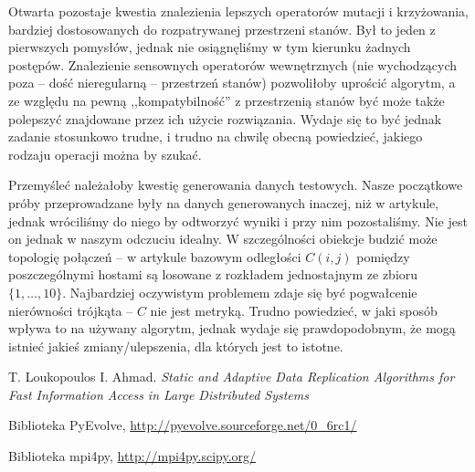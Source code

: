 \documentclass[11pt,pdftex,a4paper]{scrartcl}
\begin{document}
Otwarta pozostaje kwestia znalezienia lepszych operatorów mutacji i krzyżowania, bardziej dostosowanych
do rozpatrywanej przestrzeni stanów. Był to jeden z pierwszych pomysłów, jednak nie osiągnęliśmy w tym
kierunku żadnych postępów. Znalezienie sensownych operatorów wewnętrznych (nie wychodzących poza --
dość nieregularną -- przestrzeń stanów) pozwoliłoby uprościć algorytm, a ze względu na pewną 
,,kompatybilność'' z przestrzenią stanów być może także polepszyć znajdowane przez ich użycie 
rozwiązania. Wydaje się to być jednak zadanie stosunkowo trudne, i trudno na chwilę obecną powiedzieć,
jakiego rodzaju operacji można by szukać.

Przemyśleć należałoby kwestię generowania danych testowych. Nasze początkowe próby przeprowadzane
były na danych generowanych inaczej, niż w artykule, jednak wróciliśmy do niego by odtworzyć wyniki
i przy nim pozostaliśmy. Nie jest on jednak w naszym odczuciu idealny. W szczególności obiekcje 
budzić może topologię połączeń -- w artykule bazowym odległości \(C(i,j)\) pomiędzy poszczególnymi
hostami są losowane z rozkładem jednostajnym ze zbioru \(\{1,\ldots,10\}\). Najbardziej oczywistym
problemem zdaje się być pogwałcenie nierówności trójkąta -- \(C\) nie jest metryką. Trudno powiedzieć,
w jaki sposób wpływa to na używany algorytm, jednak wydaje się prawdopodobnym, że mogą istnieć jakieś
zmiany/ulepszenia, dla których jest to istotne. 

\begin{thebibliography}{}

  T. Loukopoulos I. Ahmad.
  \emph{Static and Adaptive Data Replication Algorithms for Fast Information Access in 
    Large Distributed Systems}

  Biblioteka PyEvolve,
  \url{http://pyevolve.sourceforge.net/0_6rc1/}

  Biblioteka mpi4py,
  \url{http://mpi4py.scipy.org/}

\end{thebibliography}
\end{document}
